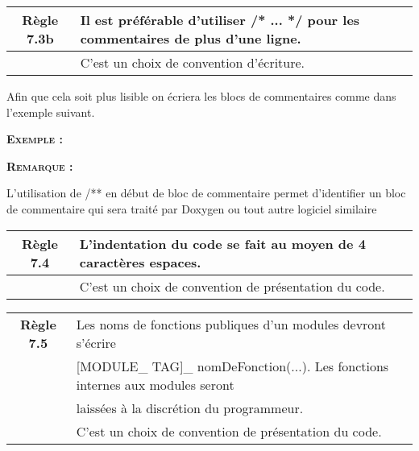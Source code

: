 \medskip

\begin{center}
\begin{tabular}{|c l|}
\hline
\rowcolor{red!10}\textbf{Règle 7.3b} & Il est préférable d’utiliser /* ... */ pour les commentaires de plus d’une ligne.\\ \hline
 & C’est un choix de convention d’écriture. \\ \hline
\hline
\end{tabular}
\end{center}

Afin que cela soit plus lisible on écriera les blocs de commentaires comme dans l’exemple suivant.

\smallskip
\begin{large}
\textbf{\textsc{Exemple :}}
\end{large}


\smallskip
\begin{large}
\textbf{\textsc{Remarque :}}
\end{large}
L’utilisation de /** en début de bloc de commentaire permet d’identifier un bloc de commentaire qui sera traité par Doxygen ou tout autre logiciel similaire

\medskip

\begin{center}
\begin{tabular}{|c l|}
\hline
\rowcolor{red!10}\textbf{Règle 7.4} & L’indentation du code se fait au moyen de 4 caractères espaces.\\ \hline
 & C’est un choix de convention de présentation du code. \\ \hline
\hline
\end{tabular}
\end{center}

\medskip

\begin{center}
\begin{tabular}{|c l|}
\hline
\rowcolor{red!10}\textbf{Règle 7.5} & Les noms de fonctions publiques d’un modules devront s’écrire \\
\rowcolor{red!10} & [MODULE\_ TAG]\_ nomDeFonction(...). Les fonctions internes aux modules seront \\
\rowcolor{red!10} & laissées à la discrétion du programmeur.\\ \hline
 & C’est un choix de convention de présentation du code. \\ \hline
\hline
\end{tabular}
\end{center}

\pagebreak